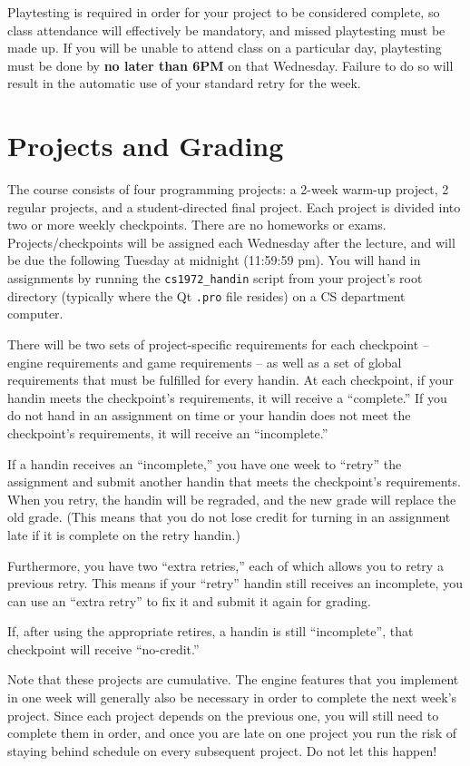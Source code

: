\documentclass{cs1972}
\begin{document}
 Playtesting is required in order for your project to be considered complete, so class attendance will effectively be mandatory, and missed playtesting must be made up. If you will be unable to attend class on a particular day, playtesting must be done by \textbf{no later than 6PM} on that Wednesday. Failure to do so will result in the automatic use of your standard retry for the week.
  
 \section*{Projects and Grading}
 The course consists of four programming projects: a 2-week warm-up project, 2 regular projects, and a student-directed final project. Each project is divided into two or more weekly checkpoints. There are no homeworks or exams. Projects/checkpoints will be assigned each Wednesday after the lecture, and will be due the following Tuesday at midnight (11:59:59 pm). You will hand in assignments by running the \texttt{cs1972\_handin} script from your project's root directory (typically where the Qt \texttt{.pro} file resides) on a CS department computer.
 
 There will be two sets of project-specific requirements for each checkpoint -- engine requirements and game requirements -- as well as a set of global requirements that must be fulfilled for every handin. At each checkpoint, if your handin meets the checkpoint's requirements, it will receive a ``complete.'' If you do not hand in an assignment on time or your handin does not meet the checkpoint's requirements, it will receive an ``incomplete.'' 
 
 If a handin receives an ``incomplete,'' you have one week to ``retry'' the assignment and submit another handin that meets the checkpoint's requirements. When you retry, the handin will be regraded, and the new grade will replace the old grade. (This means that you do not lose credit for turning in an assignment late if it is complete on the retry handin.)
 
 Furthermore, you have two ``extra retries,'' each of which allows you to retry a previous retry. This means if your ``retry'' handin still receives an incomplete, you can use an ``extra retry'' to fix it and submit it again for grading.

 If, after using the appropriate retires, a handin is still ``incomplete'', that checkpoint will receive ``no-credit.''
 
 Note that these projects are cumulative. The engine features that you implement in one week will generally also be necessary in order to complete the next week's project. Since each project depends on the previous one, you will still need to complete them in order, and once you are late on one project you run the risk of staying behind schedule on every subsequent project. Do not let this happen!
 
\end{document}
